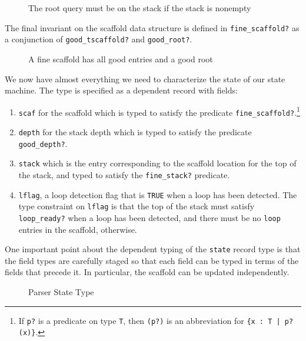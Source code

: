 \documentclass[sigplan,10pt,anonymous,review]{acmart}\settopmatter{printfolios=true,printccs=false,printacmref=false}
\begin{document}
\begin{CCSXML}
\begin{figure}[h!]
  
    \vspace*{-4mm}
\caption{\small The root query must be on the stack if the stack is nonempty}
\label{pvs:goodroot}
\end{figure}

The final invariant on the scaffold data structure is defined in
\texttt{fine\_scaffold?} as a conjunction of \texttt{good\_tscaffold?}
and \texttt{good\_root?}\@.  
\begin{figure}[h!]
  
    \vspace*{-4mm}
\caption{\small A fine scaffold has all good entries and a good root}
\label{pvs:finescaffold}
\end{figure}

We now have almost everything we need to characterize the state of our
state machine.  The type is specified as a dependent record with fields:
\begin{enumerate}
\item \texttt{scaf} for the scaffold which is typed to satisfy the predicate \texttt{fine\_scaffold?}.\footnote{If \texttt{p?} is a predicate on type \texttt{T}, then \texttt{(p?)} is an abbreviation for \texttt{\{x : T | p?(x)\}}.}
\item \texttt{depth} for the stack depth which is typed to satisfy the predicate \texttt{good\_depth?}.
\item \texttt{stack} which is the entry corresponding to the scaffold location for
  the top of the stack, and typed to satisfy the \texttt{fine\_stack?} predicate.
\item \texttt{lflag}, a loop detection flag that is \texttt{TRUE} when a loop has been detected.  The type constraint on \texttt{lflag} is that the top of the stack must satisfy \texttt{loop\_ready?} when a loop has been detected, and there must be no \texttt{loop} entries in the scaffold, otherwise.  
\end{enumerate}
One important point about the dependent typing of the \texttt{state} record type
is that the field types are carefully staged so that each field can be typed 
in terms of the fields that precede it.  In particular, the scaffold can be updated independently.  
\begin{figure}[h!]
  
    \vspace*{-4mm}
\caption{\small Parser State Type}
\label{pvs:state}
\end{figure}


\end{CCSXML}
\end{document}
